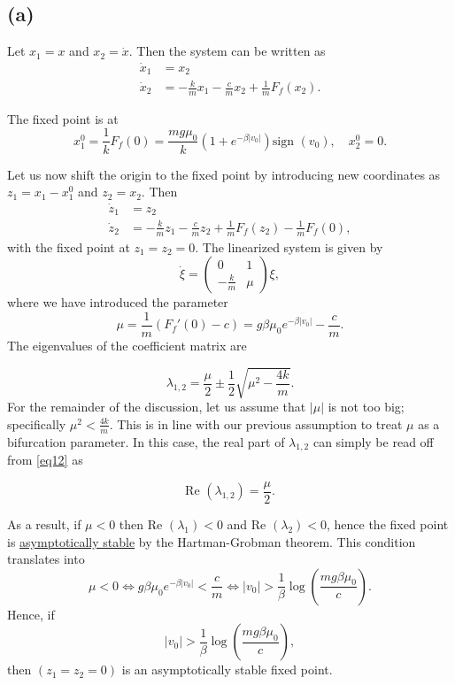 \documentclass[twoside,10pt,a4paper]{article}
\begin{document}
\subsection*{(a)}
Let $x_1=x$ and $x_2=\dot{x}$. Then the system can be written as
\begin{align*}
\dot{x}_1&=x_2\\
\dot{x}_2&=-\frac{k}{m}x_1 -\frac{c}{m}x_2 +\frac{1}{m}F_f(x_2).
\end{align*}

The fixed point is at 
$$
x^{0}_1=\frac{1}{k}F_f(0)=\frac{mg\mu_0}{k}\left(1+e^{-\beta|v_0|} \right)\text{sign }(v_0), \quad x^{0}_2=0.
$$

Let us now shift the origin to the fixed point by introducing new coordinates as $z_1 = x_1 - x^0_1$ and $z_2=x_2$. 
Then 
\begin{align}
\label{eq111}
\dot{z}_1&=z_2\\
\dot{z}_2&=-\frac{k}{m}z_1 -\frac{c}{m}z_2 +\frac{1}{m}F_f(z_2)-\frac{1}{m}F_f(0),
\end{align}
with the fixed point at $z_1=z_2=0$. The linearized system is given by
\begin{equation}
\dot{\xi}=\begin{pmatrix} 0 & 1 \\ -\frac{k}{m} & \mu \end{pmatrix}\xi, 
\end{equation}
where we have introduced the parameter
\begin{equation}
\boxed{\mu=\frac{1}{m}\left(F_f'(0)-c\right) = g\beta \mu_0 e^{-\beta|v_0|}-\frac{c}{m}}. 
\end{equation}
The eigenvalues of the coefficient matrix are 

\begin{equation}
\label{eq12}
\lambda_{1,2} = \frac{\mu}{2}\pm \frac{1}{2}\sqrt{\mu^2-\frac{4k}{m}}.
\end{equation}
For the remainder of the discussion, let us assume that  $|\mu|$ is not too big; specifically $\mu^2 < \frac{4k}{m}$. This is in line with our previous assumption to treat $\mu$ as a bifurcation parameter. In this case, the real part of $\lambda_{1,2}$ can simply be read off from \eqref{eq12} as 

$$
\text{Re }(\lambda_{1,2}) = \frac{\mu}{2}. 
$$

As a result, if $\mu<0$ then Re $(\lambda_1)<0$ and Re $(\lambda_2)<0$, hence the fixed point is \underline{asymptotically stable} by the Hartman-Grobman theorem. This condition translates into
$$
\mu<0 \Leftrightarrow g\beta\mu_0e^{-\beta|v_0|}<\frac{c}{m} \Leftrightarrow |v_0| > \frac{1}{\beta}\log\left(\frac{mg\beta \mu_0}{c} \right).
$$
Hence, if \begin{equation}
\label{eqcond}
|v_0| > \frac{1}{\beta}\log\left(\frac{mg\beta \mu_0}{c} \right),
\end{equation}
then $(z_1=z_2=0)$ is an asymptotically stable fixed point. 
\end{document}
